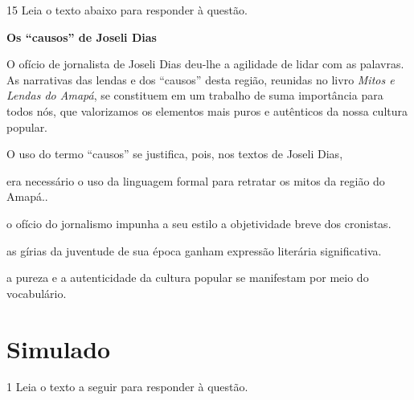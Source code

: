 \num{15} Leia o texto abaixo para responder à questão. 

\begin{myquote}

\textbf{Os ``causos'' de Joseli Dias}

O ofício de jornalista de Joseli Dias deu-lhe a agilidade de lidar com as
palavras. As narrativas das lendas e dos ``causos'' desta região, reunidas no
livro \textit{Mitos e Lendas do Amapá}, se constituem em um trabalho de suma
importância para todos nós, que valorizamos os elementos mais puros e
autênticos da nossa cultura popular.


\end{myquote}

O uso do termo ``causos'' se justifica, pois, nos textos de Joseli Dias,

\begin{escolha}
    
    \item era necessário o uso da linguagem formal para retratar os mitos da região do Amapá..
    
    \item o ofício do jornalismo impunha a seu estilo a objetividade breve dos cronistas.
    
    \item as gírias da juventude de sua época ganham expressão literária significativa.
    
    \item a pureza e a autenticidade da cultura popular se manifestam por meio do vocabulário.

\end{escolha}


\chapter[Simulado 4]{Simulado}

\num{1} Leia o texto a seguir para responder à questão. 

